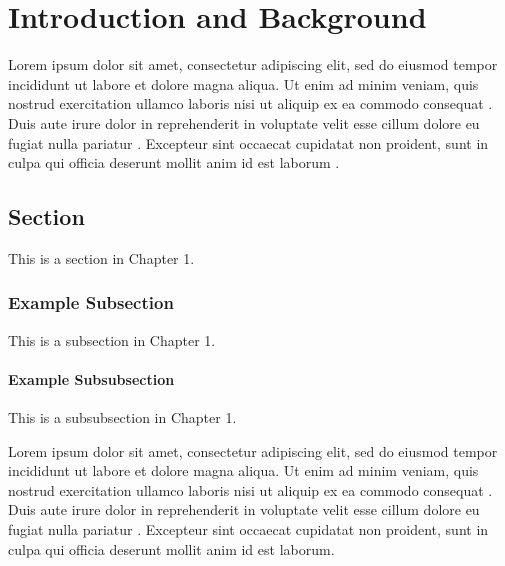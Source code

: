 \chapter{Introduction and Background}
\label{chap:introduction}

Lorem ipsum dolor sit amet, consectetur adipiscing elit, sed do eiusmod tempor incididunt ut labore et dolore magna aliqua. Ut enim ad minim veniam, quis nostrud exercitation ullamco laboris nisi ut aliquip ex ea commodo consequat \textcite{ref1}. Duis aute irure dolor in reprehenderit in voluptate velit esse cillum dolore eu fugiat nulla pariatur \textcite{ref2}. Excepteur sint occaecat cupidatat non proident, sunt in culpa qui officia deserunt mollit anim id est laborum \textcite{ref3}.

\section{Section}
\label{sec:sec-1-1}

This is a section in Chapter 1.

\subsection{Example Subsection}
\label{subsec:sec-1-1-1}

This is a subsection in Chapter 1.

\subsubsection{Example Subsubsection}

This is a subsubsection in Chapter 1.

Lorem ipsum dolor sit amet, consectetur adipiscing elit, sed do eiusmod tempor incididunt ut labore et dolore magna aliqua. Ut enim ad minim veniam, quis nostrud exercitation ullamco laboris nisi ut aliquip ex ea commodo consequat \textcite{ref1}. Duis aute irure dolor in reprehenderit in voluptate velit esse cillum dolore eu fugiat nulla pariatur \textcite{ref2}. Excepteur sint occaecat cupidatat non proident, sunt in culpa qui officia deserunt mollit anim id est laborum.
